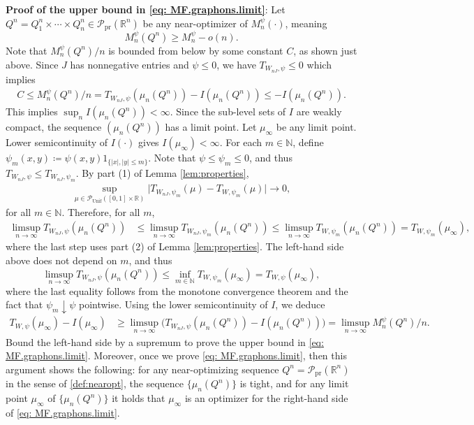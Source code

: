 \documentclass[11pt,reqno]{amsart}
\numberwithin{equation}{section}
\theoremstyle{definition}
\def\R{{\mathbb R}}
\def\N{{\mathbb N}}
\def\P{{\mathcal P}}
\def\Pprod{\P_{\mathrm{pr}}}
\def\Punif{\P_{\mathrm{Unif}}([0,1] \times \R)}
\begin{document}
\noindent\textbf{Proof of the upper bound in \eqref{eq: MF.graphons.limit}}: 
Let $Q^n = Q^n_1 \times \cdots \times Q^n_n \in \Pprod(\R^n)$ be any near-optimizer of $M_n^\psi(\cdot)$, meaning
\begin{equation}
	M_n^{\psi}(Q^n) \ge M_n^\psi - o(n). \label{def:nearopt}
\end{equation}
Note that $ M_n^{\psi}(Q^n)/n$ is bounded from below by some constant $C$, as shown just above. Since $J$ has nonnegative entries and $\psi \le 0$, we have $T_{W_{nJ},\psi} \le 0$ which implies
\begin{align*}
	C \le M_n^{\psi}(Q^n)/n = T_{W_{nJ},\psi}(\mu_n(Q^n)) - I(\mu_n(Q^n)) \le - I(\mu_n(Q^n)).
\end{align*}
This implies $\sup_n I(\mu_n(Q^n)) < \infty$. Since the sub-level sets of $I$ are weakly compact, the sequence $(\mu_n(Q^n))$ has a limit point. Let $\mu_\infty$ be any limit point. Lower semicontinuity of $I(\cdot)$ gives $I(\mu_\infty)<\infty$. For each $m \in \N$, define $ \psi_m(x,y) \coloneqq \psi(x,y)1_{\{|x|,|y| \le m\}}$. Note that $\psi \le \psi_m \le 0$, and thus $T_{W_{nJ},\psi} \le T_{W_{nJ},\psi_m}$.  By part (1) of Lemma \ref{lem:properties}, 
\begin{align*}
	\sup_{\mu\in \Punif}\Big|T_{W_{nJ},\psi_m}(\mu)-T_{W,\psi_m}(\mu)\Big|\to 0,
\end{align*}
for all $ m \in \N $. Therefore, for all $ m$,
\begin{align*}
	\limsup_{n \to \infty} T_{W_{nJ}, \psi}(\mu_n(Q^n)) &\le \limsup_{n \to \infty} T_{W_{nJ},\psi_m}(\mu_n(Q^n)) \le \limsup_{n \to \infty} T_{W,\psi_m}(\mu_n(Q^n)) = T_{W,\psi_m}(\mu_\infty), 
\end{align*}
where the last step uses part (2) of Lemma \ref{lem:properties}.  The left-hand side above does not depend on $ m $, and thus
\begin{equation*}
	\limsup_{n \to \infty} T_{W_{nJ}, \psi}(\mu_n(Q^n)) \le \inf_{m \in \N} T_{W,\psi_m}(\mu_\infty) = T_{W,\psi}(\mu_\infty),
\end{equation*}
where the last equality follows from the monotone convergence theorem and the fact that $\psi_m \downarrow \psi$ pointwise.
Using the lower semicontinuity of $ I $, we deduce
\begin{align*}
	T_{W,\psi}(\mu_\infty) - I(\mu_\infty) 	&\ge \limsup_{n \to \infty} \big(T_{W_{n J},\psi} (\mu_n(Q^n)) - I(\mu_n(Q^n)) \big)   =\limsup_{n \to \infty} M_n^\psi (Q^n)/n.
\end{align*}
Bound the left-hand side by a supremum to prove the upper bound in \eqref{eq: MF.graphons.limit}. Moreover, once we prove \eqref{eq: MF.graphons.limit}, then this argument shows the following: for any near-optimizing sequence $Q^n = \Pprod(\R^n)$ in the sense of \eqref{def:nearopt}, the sequence $\{\mu_n(Q^n)\}$ is tight, and for any limit point $\mu_\infty$ of $\{\mu_n(Q^n)\}$ it holds that $\mu_\infty$ is an optimizer for the right-hand side of \eqref{eq: MF.graphons.limit}. 
\end{document}
